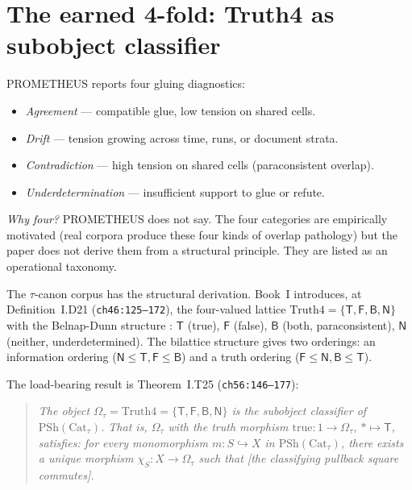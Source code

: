 \documentclass{pantarhei-researchnote}
\newcommand{\Truth}{\ensuremath{\mathrm{Truth4}}}
\newcommand{\Omegatau}{\ensuremath{\Omega_{\tau}}}
\newcommand{\Cattau}{\ensuremath{\mathrm{Cat}_{\tau}}}
\newcommand{\PSh}{\ensuremath{\mathrm{PSh}}}
\begin{document}
\section{The earned 4-fold: Truth4 as subobject classifier}
\label{sec:truth4}

PROMETHEUS reports four gluing diagnostics:

\begin{itemize}
\item \emph{Agreement} --- compatible glue, low tension on shared cells.
\item \emph{Drift} --- tension growing across time, runs, or document strata.
\item \emph{Contradiction} --- high tension on shared cells (paraconsistent overlap).
\item \emph{Underdetermination} --- insufficient support to glue or refute.
\end{itemize}

\emph{Why four?} PROMETHEUS does not say. The four categories are
empirically motivated (real corpora produce these four kinds of
overlap pathology) but the paper does not derive them from a
structural principle. They are listed as an operational taxonomy.

The $\tau$-canon corpus has the structural derivation. Book~I
\cite{PantaRhei-BookI} introduces, at Definition~I.D21
(\texttt{ch46:125--172}), the four-valued lattice $\Truth = \{
\mathsf{T}, \mathsf{F}, \mathsf{B}, \mathsf{N} \}$ with the
Belnap-Dunn structure \cite{Belnap-1977,Dunn-1976}: $\mathsf{T}$
(true), $\mathsf{F}$ (false), $\mathsf{B}$ (both, paraconsistent),
$\mathsf{N}$ (neither, underdetermined). The bilattice structure
gives two orderings: an information ordering ($\mathsf{N} \le
\mathsf{T}, \mathsf{F} \le \mathsf{B}$) and a truth ordering
($\mathsf{F} \le \mathsf{N}, \mathsf{B} \le \mathsf{T}$).

The load-bearing result is Theorem~I.T25 (\texttt{ch56:146--177}):

\begin{quote}
\itshape
The object $\Omegatau = \Truth = \{\mathsf{T}, \mathsf{F},
\mathsf{B}, \mathsf{N}\}$ is the subobject classifier of
$\PSh(\Cattau)$. That is, $\Omegatau$ with the truth morphism
$\mathrm{true} : 1 \to \Omegatau$, $* \mapsto \mathsf{T}$, satisfies:
for every monomorphism $m : S \hookrightarrow X$ in
$\PSh(\Cattau)$, there exists a unique morphism $\chi_{S} : X \to
\Omegatau$ such that [the classifying pullback square commutes].
\end{quote}
\end{document}
